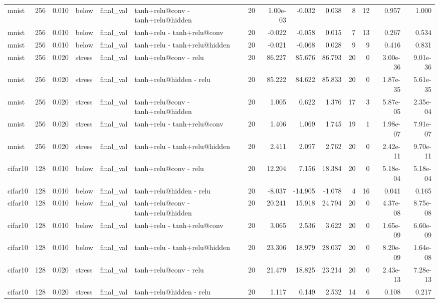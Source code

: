 \begin{table}[htbp]
{\begin{tabular}{@{}lrrlllrrrrrrrr@{}}
mnist & 256 & 0.010 & below & final\_val & tanh+relu@conv - tanh+relu@hidden & 20 & 1.00e-03 & -0.032 & 0.038 & 8 & 12 & 0.957 & 1.000 \\
mnist & 256 & 0.010 & below & final\_val & tanh+relu - tanh+relu@conv & 20 & -0.022 & -0.058 & 0.015 & 7 & 13 & 0.267 & 0.534 \\
mnist & 256 & 0.010 & below & final\_val & tanh+relu - tanh+relu@hidden & 20 & -0.021 & -0.068 & 0.028 & 9 & 9 & 0.416 & 0.831 \\
mnist & 256 & 0.020 & stress & final\_val & tanh+relu@conv - relu & 20 & 86.227 & 85.676 & 86.793 & 20 & 0 & 3.00e-36 & 9.01e-36 \\
mnist & 256 & 0.020 & stress & final\_val & tanh+relu@hidden - relu & 20 & 85.222 & 84.622 & 85.833 & 20 & 0 & 1.87e-35 & 5.61e-35 \\
mnist & 256 & 0.020 & stress & final\_val & tanh+relu@conv - tanh+relu@hidden & 20 & 1.005 & 0.622 & 1.376 & 17 & 3 & 5.87e-05 & 2.35e-04 \\
mnist & 256 & 0.020 & stress & final\_val & tanh+relu - tanh+relu@conv & 20 & 1.406 & 1.069 & 1.745 & 19 & 1 & 1.98e-07 & 7.91e-07 \\
mnist & 256 & 0.020 & stress & final\_val & tanh+relu - tanh+relu@hidden & 20 & 2.411 & 2.097 & 2.762 & 20 & 0 & 2.42e-11 & 9.70e-11 \\
cifar10 & 128 & 0.010 & below & final\_val & tanh+relu@conv - relu & 20 & 12.204 & 7.156 & 18.384 & 20 & 0 & 5.18e-04 & 5.18e-04 \\
cifar10 & 128 & 0.010 & below & final\_val & tanh+relu@hidden - relu & 20 & -8.037 & -14.905 & -1.078 & 4 & 16 & 0.041 & 0.165 \\
cifar10 & 128 & 0.010 & below & final\_val & tanh+relu@conv - tanh+relu@hidden & 20 & 20.241 & 15.918 & 24.794 & 20 & 0 & 4.37e-08 & 8.75e-08 \\
cifar10 & 128 & 0.010 & below & final\_val & tanh+relu - tanh+relu@conv & 20 & 3.065 & 2.536 & 3.622 & 20 & 0 & 1.65e-09 & 6.60e-09 \\
cifar10 & 128 & 0.010 & below & final\_val & tanh+relu - tanh+relu@hidden & 20 & 23.306 & 18.979 & 28.037 & 20 & 0 & 8.20e-09 & 1.64e-08 \\
cifar10 & 128 & 0.020 & stress & final\_val & tanh+relu@conv - relu & 20 & 21.479 & 18.825 & 23.214 & 20 & 0 & 2.43e-13 & 7.28e-13 \\
cifar10 & 128 & 0.020 & stress & final\_val & tanh+relu@hidden - relu & 20 & 1.117 & 0.149 & 2.532 & 14 & 6 & 0.108 & 0.217 \\

\end{tabular}}
\end{table}
